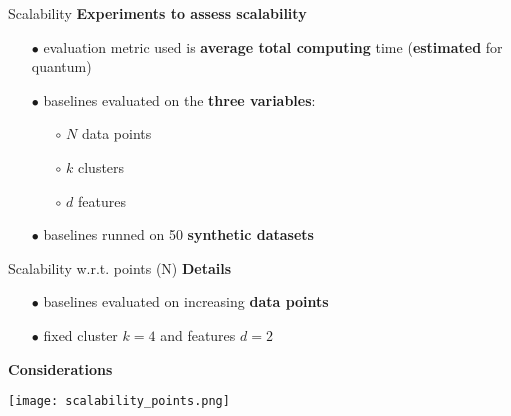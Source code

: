 		\begin{frame}{Scalability}
			\textbf{Experiments to assess scalability}
			\begin{itemize}
				\item[$\bullet$] evaluation metric used is \textbf{average total computing} time (\textbf{estimated} for quantum)
				\item[$\bullet$] baselines evaluated on the \textbf{three variables}:
				\begin{itemize}
					\item[$\circ$] $N$ data points  					
					\item[$\circ$] $k$ clusters
					\item[$\circ$] $d$ features 
				\end{itemize}
				\item[$\bullet$] baselines runned on 50 \textbf{synthetic datasets}
			\end{itemize}

		\end{frame}

		\begin{frame}[allowframebreaks]{Scalability w.r.t. points (N)}
			\textbf{Details}
			\begin{itemize}
				\item[$\bullet$] baselines evaluated on increasing \textbf{data points}
				\item[$\bullet$] fixed cluster $k=4$ and features $d=2$
			\end{itemize}


			\textbf{Considerations}
			\begin{table}[]
			\end{table}

			\begin{center}
				\texttt{[image: scalability\_points.png]}
			\end{center}	
			
		\end{frame}

